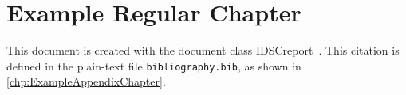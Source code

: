 
\chapter{Example Regular Chapter}
\label{chp:ExampleRegularChapter}

This document is created with the document class IDSCreport~\cite{IDSCreportClass}. This citation is defined in the plain-text file \texttt{bibliography.bib}, as shown in \cref{chp:ExampleAppendixChapter}.
